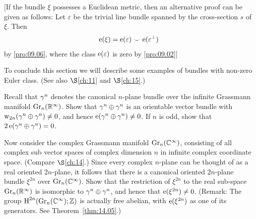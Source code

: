 \documentclass[../main]{subfiles}
\begin{document}
[If the bundle $\xi$ possesses a Euclidean metric, then an alternative proof can be given as follows: Let $\varepsilon$ be the trivial line bundle spanned by the cross-section $s$ of $\xi$. Then
\[
\operatorname{e}(\xi)=\operatorname{e}(\varepsilon) \smile \operatorname{e}(\varepsilon^{\perp})
\]
by \ref{pro:09.06}, where the class $\operatorname{e}(\varepsilon)$ is zero by \ref{pro:09.02}]

To conclude this section we will describe some examples of bundles with non-zero Euler class. (See also $\S$\ref{ch:11} and $\S$\ref{ch:15}.)

\begin{problem}\label{pro:9-A} Recall that $\gamma^{n}$ denotes the canonical $n$-plane bundle over the infinite Grassmann manifold $\operatorname{Gr}_{n}(\mathbb R^{\infty})$. Show that $\gamma^{n} \oplus \gamma^{n}$ is an orientable vector bundle with $\operatorname{w}_{2 n}(\gamma^{n} \oplus \gamma^{n}) \neq 0$, and hence $\operatorname{e}(\gamma^{n} \oplus \gamma^{n}) \neq 0$. If $n$ is odd, show that $2 \operatorname{e}(\gamma^{n} \oplus \gamma^{n})=0$.

\end{problem}

\begin{problem}\label{pro:9-B} Now consider the complex Grassmann manifold $\operatorname{Gr}_{n}(\mathbb C^{\infty})$, consisting of all complex sub vector spaces of complex dimension $n$ in infinite complex coordinate space. (Compare $\S$\ref{ch:14}.) Since every complex $n$-plane can be thought of as a real oriented $2 n$-plane, it follows that there is a canonical oriented $2 n$-plane bundle $\xi^{2n}$ over $\operatorname{Gr}_{n}(\mathbb C^{\infty})$. Show that the restriction of $\xi^{2 n}$ to the real sub-space $\operatorname{Gr}_{n}(\mathbb R^{\infty})$ is isomorphic to $\gamma^{n} \oplus \gamma^{n}$, and hence that $\operatorname{e}(\xi^{2 n}) \neq 0$. (Remark: The group $\operatorname{H}^{2 n}(\operatorname{Gr}_{n}(\mathbb C^{\infty}) ; \mathbb{Z})$ is actually free abelian, with $\operatorname{e}(\xi^{2 n})$ as one of its generators. See Theorem~\ref{thm:14.05}.)

\end{problem}
\end{document}
